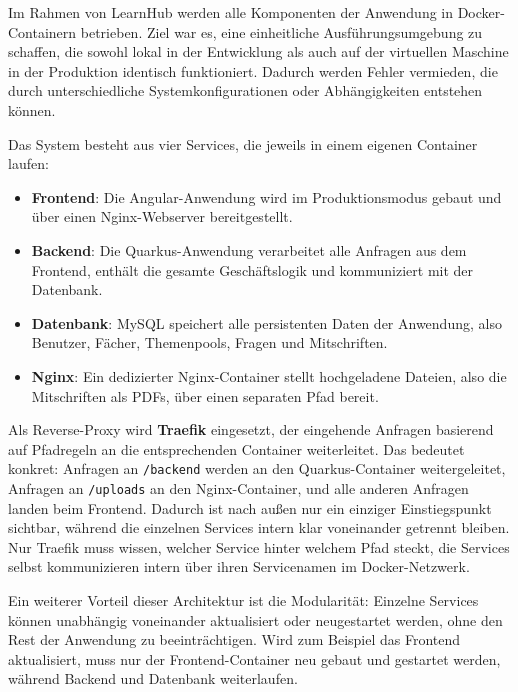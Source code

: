 Im Rahmen von LearnHub werden alle Komponenten der Anwendung in 
Docker-Containern betrieben. Ziel war es, eine einheitliche 
Ausführungsumgebung zu schaffen, die sowohl lokal in der Entwicklung 
als auch auf der virtuellen Maschine in der Produktion identisch 
funktioniert. Dadurch werden Fehler vermieden, die durch 
unterschiedliche Systemkonfigurationen oder Abhängigkeiten entstehen 
können.

Das System besteht aus vier Services, die jeweils in einem eigenen 
Container laufen:

\begin{itemize}
    \item \textbf{Frontend}: Die Angular-Anwendung wird im 
    Produktionsmodus gebaut und über einen Nginx-Webserver 
    bereitgestellt.
    
    \item \textbf{Backend}: Die Quarkus-Anwendung verarbeitet alle 
    Anfragen aus dem Frontend, enthält die gesamte Geschäftslogik 
    und kommuniziert mit der Datenbank.
    
    \item \textbf{Datenbank}: MySQL speichert alle persistenten Daten 
    der Anwendung, also Benutzer, Fächer, Themenpools, Fragen und 
    Mitschriften.
    
    \item \textbf{Nginx}: Ein dedizierter Nginx-Container stellt 
    hochgeladene Dateien, also die Mitschriften als PDFs, über einen 
    separaten Pfad bereit.
\end{itemize}

Als Reverse-Proxy wird \textbf{Traefik} eingesetzt, der eingehende 
Anfragen basierend auf Pfadregeln an die entsprechenden Container 
weiterleitet. Das bedeutet konkret: Anfragen an \texttt{/backend} 
werden an den Quarkus-Container weitergeleitet, Anfragen an 
\texttt{/uploads} an den Nginx-Container, und alle anderen Anfragen 
landen beim Frontend. Dadurch ist nach außen nur ein einziger 
Einstiegspunkt sichtbar, während die einzelnen Services intern klar 
voneinander getrennt bleiben. Nur Traefik muss wissen, welcher 
Service hinter welchem Pfad steckt, die Services selbst kommunizieren 
intern über ihren Servicenamen im Docker-Netzwerk.

Ein weiterer Vorteil dieser Architektur ist die Modularität: Einzelne 
Services können unabhängig voneinander aktualisiert oder neugestartet 
werden, ohne den Rest der Anwendung zu beeinträchtigen. Wird zum 
Beispiel das Frontend aktualisiert, muss nur der Frontend-Container 
neu gebaut und gestartet werden, während Backend und Datenbank 
weiterlaufen.

